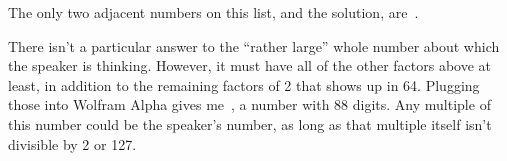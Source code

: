 \documentclass{article}
\begin{document}
The only two adjacent numbers on this list, and the solution, are
\,.

There isn't a particular answer to the ``rather large'' whole number about which the speaker is thinking.
However, it must have all of the other factors above at least, in addition to the remaining factors of 2 that shows up in 64.
Plugging those into Wolfram Alpha gives me \,, a number with 88 digits.
Any multiple of this number could be the speaker's number, as long as that multiple itself isn't divisible by 2 or 127.
\end{document}
